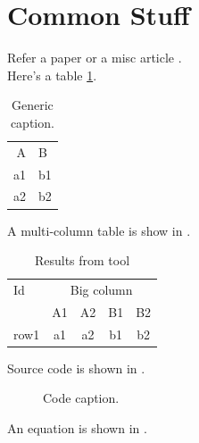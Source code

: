 
\section{Common Stuff}
\label{sec:common}

Refer a paper \citep{Lamport86} or a misc article \citep{lcommon}.\\

Here's a table \cref{tab:tcommon}.\\

\begin{table}
\centering
\small{
  \centering
  \begin{tabular}{rl} \toprule
   {A}& B  \\  
   \cmidrule(lr){1-2}
   a1  & b1  \\ 
   \midrule
   a2  & b2 \\
   \bottomrule
   \end{tabular}
 }
\caption{Generic caption.}
\label{tab:tcommon}
\end{table}

A multi-column table is show in .\\

\begin{table}
  \centering
  \begin{tabular}{lcccc}
    \toprule
    Id & \multicolumn{4}{c}{Big column} \\
      \cmidrule(lr){2-3} \cmidrule(lr){4-5} 
             & A1   &  A2    & B1 & B2  \\ 
      \midrule                       
      row1   & a1   &  a2    & b1 & b2  \\
 \bottomrule
\end{tabular}
\caption{Results from tool \Tool}
\label{tab:tcommon2}
\end{table}


Source code is shown in .

\begin{figure}
\caption{Code caption.}
\label{fig:codecommon}
\end{figure}

An equation is shown in .

